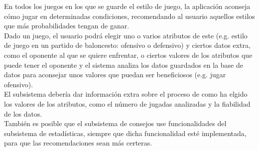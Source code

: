 En todos los juegos en los que se guarde el estilo de juego, la aplicación
aconseja cómo jugar en determinadas condiciones, recomendando al usuario aquellos
estilos que más probabilidades tengan de ganar.\\

Dado un juego, el usuario podrá elegir uno o varios atributos de este (e.g. estilo
de juego en un partido de baloncesto: ofensivo o defensivo) y ciertos datos extra,
como el oponente al que se quiere enfrentar, o ciertos valores de los atributos 
que puede tener el oponente y el sistema analiza los datos guardados en la base
de datos para aconsejar unos valores que puedan ser beneficiosos (e.g. jugar ofensivo).\\

El subsistema debería dar información extra sobre el proceso de como ha elgido los
valores de los atributos, como el número de jugadas analizadas y la fiabilidad de los datos.\\

También es posible que el subsistema de consejos use funcionalidades del subsistema
de estadísticas, siempre que dicha funcionalidad esté implementada, para que las
recomendaciones sean más certeras.\\

